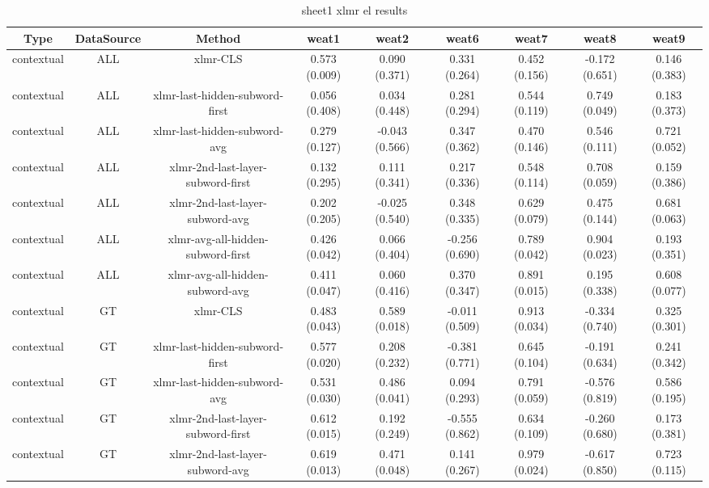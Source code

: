 \begin{sidewaystable}[htb]
    \centering
    \caption{sheet1 xlmr el results}
    \label{appendix_tab:sheet1_xlmr_el_results}
    \small
    \begin{tabular}{@{}ccccccccc@{}}
        \toprule
        Type & DataSource & Method & weat1 & weat2 & weat6 & weat7 & weat8 & weat9 \\
        \midrule
        contextual & ALL & xlmr-CLS & 0.573 (0.009) & 0.090 (0.371) & 0.331 (0.264) & 0.452 (0.156) & -0.172 (0.651) & 0.146 (0.383) \\
        contextual & ALL & xlmr-last-hidden-subword-first & 0.056 (0.408) & 0.034 (0.448) & 0.281 (0.294) & 0.544 (0.119) & 0.749 (0.049) & 0.183 (0.373) \\
        contextual & ALL & xlmr-last-hidden-subword-avg & 0.279 (0.127) & -0.043 (0.566) & 0.347 (0.362) & 0.470 (0.146) & 0.546 (0.111) & 0.721 (0.052) \\
        contextual & ALL & xlmr-2nd-last-layer-subword-first & 0.132 (0.295) & 0.111 (0.341) & 0.217 (0.336) & 0.548 (0.114) & 0.708 (0.059) & 0.159 (0.386) \\
        contextual & ALL & xlmr-2nd-last-layer-subword-avg & 0.202 (0.205) & -0.025 (0.540) & 0.348 (0.335) & 0.629 (0.079) & 0.475 (0.144) & 0.681 (0.063) \\
        contextual & ALL & xlmr-avg-all-hidden-subword-first & 0.426 (0.042) & 0.066 (0.404) & -0.256 (0.690) & 0.789 (0.042) & 0.904 (0.023) & 0.193 (0.351) \\
        contextual & ALL & xlmr-avg-all-hidden-subword-avg & 0.411 (0.047) & 0.060 (0.416) & 0.370 (0.347) & 0.891 (0.015) & 0.195 (0.338) & 0.608 (0.077) \\
        contextual & GT & xlmr-CLS & 0.483 (0.043) & 0.589 (0.018) & -0.011 (0.509) & 0.913 (0.034) & -0.334 (0.740) & 0.325 (0.301) \\
        contextual & GT & xlmr-last-hidden-subword-first & 0.577 (0.020) & 0.208 (0.232) & -0.381 (0.771) & 0.645 (0.104) & -0.191 (0.634) & 0.241 (0.342) \\
        contextual & GT & xlmr-last-hidden-subword-avg & 0.531 (0.030) & 0.486 (0.041) & 0.094 (0.293) & 0.791 (0.059) & -0.576 (0.819) & 0.586 (0.195) \\
        contextual & GT & xlmr-2nd-last-layer-subword-first & 0.612 (0.015) & 0.192 (0.249) & -0.555 (0.862) & 0.634 (0.109) & -0.260 (0.680) & 0.173 (0.381) \\
        contextual & GT & xlmr-2nd-last-layer-subword-avg & 0.619 (0.013) & 0.471 (0.048) & 0.141 (0.267) & 0.979 (0.024) & -0.617 (0.850) & 0.723 (0.115) \\

\end{tabular}
\end{sidewaystable}
